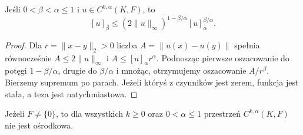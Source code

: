 \begin{lemat}
\label{ma2:lem:holder-interpolation}
Jeśli $0<\beta<\alpha\le1$ i $u\in C^{0,\alpha}(K,F)$,
to
\[
 [u]_\beta\le
 (2\|u\|_\infty)^{1-\beta/\alpha}
 [u]_\alpha^{\beta/\alpha}.
\]
\end{lemat}
\begin{proof}
Dla $r=\|x-y\|_2>0$ liczba
$A=\|u(x)-u(y)\|$ spełnia równocześnie
$A\le2\|u\|_\infty$ i $A\le[u]_\alpha r^\alpha$.
Podnosząc pierwsze oszacowanie do potęgi
$1-\beta/\alpha$, drugie do $\beta/\alpha$
i mnożąc, otrzymujemy oszacowanie $A/r^\beta$.
Bierzemy supremum po parach.
Jeżeli któryś z czynników jest zerem,
funkcja jest stała, a teza jest natychmiastowa.
\end{proof}

\begin{twierdzenie}[Nieośrodkowość]
\label{ma2:thm:holder-nonseparable}
Jeżeli $F\ne\{0\}$, to dla wszystkich $k\ge0$
oraz $0<\alpha\le1$ przestrzeń $C^{k,\alpha}(K,F)$
nie jest ośrodkowa.
\end{twierdzenie}
